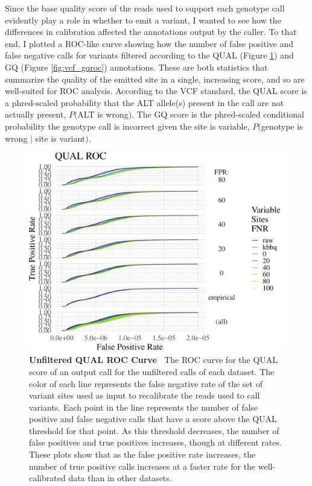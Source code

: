 \documentclass{report}
\newcommand{\titlecaption}[2]{\caption[#1]{\textbf{#1 \textbar\,} #2}}
\begin{document}
\begin{outline}
\item Since the base quality score of the reads used to support each genotype call evidently play a role in whether to emit a variant, I wanted to see how the differences in calibration affected the annotations output by the caller. To that end, I plotted a ROC-like curve showing how the number of false positive and false negative calls for variants filtered according to the QUAL (Figure \ref{fig:vc_qualroc}) and GQ (Figure \ref{fig:vcf_gqroc}) annotations. These are both statistics that summarize the quality of the emitted site in a single, increasing score, and so are well-suited for ROC analysis. According to the VCF standard, the QUAL score is a phred-scaled probability that the ALT allele(s) present in the call are not actually present, $P($ALT is wrong$)$. The GQ score is the phred-scaled conditional probability the genotype call is incorrect given the site is variable, $P($genotype is wrong $|$ site is variant$)$.
\end{outline}


\begin{figure}
\centering
\includegraphics[width=.7\textwidth]{qualroc.pdf}
\titlecaption{Unfiltered QUAL ROC Curve}{The ROC curve for the QUAL score of an output call for the unfiltered calls of each dataset. The color of each line represents the false negative rate of the set of variant sites used as input to recalibrate the reads used to call variants. Each point in the line represents the number of false positive and false negative calls that have a score above the QUAL threshold for that point. As this threshold decreases, the number of false positives and true positives increases, though at different rates. These plots show that as the false positive rate increases, the number of true positive calls increases at a faster rate for the well-calibrated data than in other datasets.}
\label{fig:vc_qualroc}
\end{figure}
\end{document}
